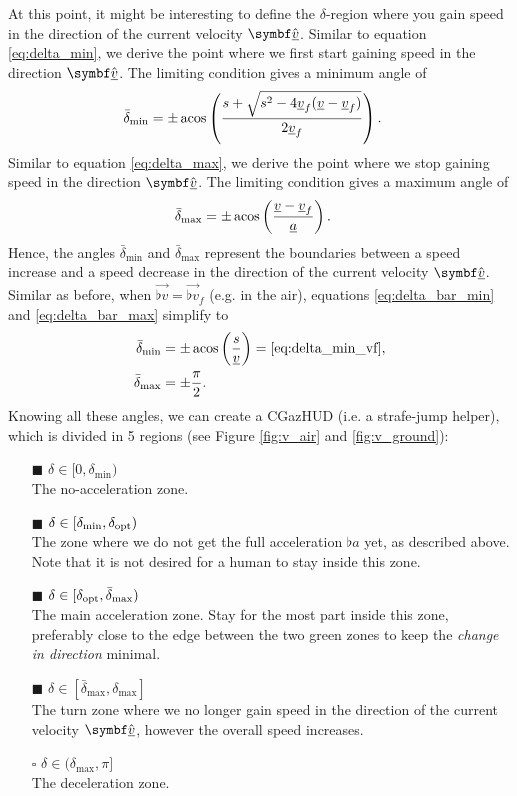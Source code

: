 At this point, it might be interesting to define the $\delta$-region where you gain speed in the direction of the current velocity $\uvec{\flat{v}}$. Similar to equation \eqref{eq:delta_min}, we derive the point where we first start gaining speed in the direction $\uvec{\flat{v}}$. The limiting condition gives a minimum angle of
\begin{align}
\label{eq:delta_bar_min}
\bar{\delta}_{\min} &= \pm\acos\left( \frac{s + \sqrt{s^2 - 4 \flat{v}_f (\flat{v} - \flat{v}_f)}}{2 \flat{v}_f} \right).
\end{align}
Similar to equation \eqref{eq:delta_max}, we derive the point where we stop gaining speed in the direction $\uvec{\flat{v}}$. The limiting condition gives a maximum angle of
\begin{align}
\label{eq:delta_bar_max}
\bar{\delta}_{\max} &= \pm\acos\left( \frac{\flat{v} - \flat{v}_f}{\flat{a}} \right).
\end{align}
Hence, the angles $\bar{\delta}_{\min}$ and $\bar{\delta}_{\max}$ represent the boundaries between a speed increase and a speed decrease in the direction of the current velocity $\uvec{\flat{v}}$. Similar as before, when $\vec{\flat{v}} = \vec{\flat{v}}_f$ (e.g. in the air), equations \eqref{eq:delta_bar_min} and \eqref{eq:delta_bar_max} simplify to
\begin{align}
\label{eq:delta_bar_min_vf}
\bar{\delta}_{\min} &= \pm\acos\left(\frac{s}{\flat{v}} \right) = \eqref{eq:delta_min_vf},\\
\label{eq:delta_bar_max_vf}
\bar{\delta}_{\max} &= \pm\frac{\pi}{2}.
\end{align}
Knowing all these angles, we can create a CGazHUD (i.e. a strafe-jump helper), which is divided in 5 regions (see Figure \ref{fig:v_air} and \ref{fig:v_ground}):
\begin{itemize}
	\item[\textcolor{cgazgrey!50}{$\blacksquare$}] $\delta \in [0, \delta_{\min})$\\
	The no-acceleration zone.
	\item[\textcolor{cgazgreen!50}{$\blacksquare$}] $\delta \in [\delta_{\min}, \delta_{\operatorname{opt}})$\\
	The zone where we do not get the full acceleration $\flat{a}$ yet, as described above. Note that it is not desired for a human to stay inside this zone.
	\item[\textcolor{cgazdarkgreen!50}{$\blacksquare$}] $\delta \in [\delta_{\operatorname{opt}}, \bar{\delta}_{\max})$\\
	The main acceleration zone. Stay for the most part inside this zone, preferably close to the edge between the two green zones to keep the \emph{change in direction} minimal.
	\item[\textcolor{cgazyellow!50}{$\blacksquare$}] $\delta \in [\bar{\delta}_{\max}, \delta_{\max}]$\\
	The turn zone where we no longer gain speed in the direction of the current velocity $\uvec{\flat{v}}$, however the overall speed increases.
	\item[$\square$] $\delta \in (\delta_{\max}, \pi]$\\
	The deceleration zone.
\end{itemize}

